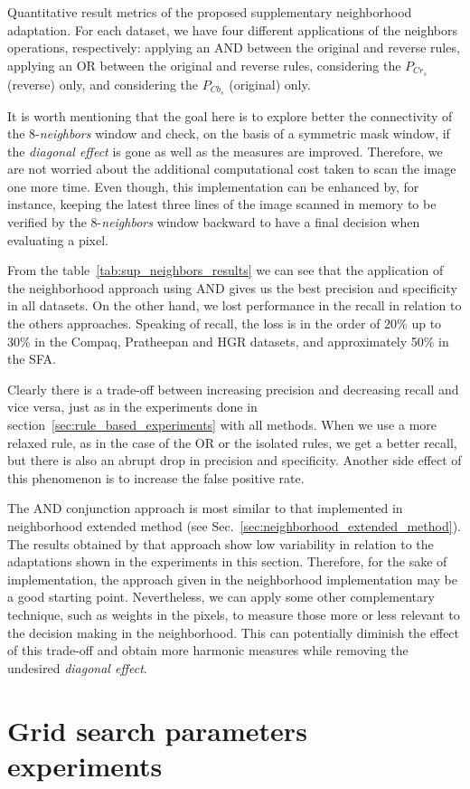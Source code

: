 \begin{table}[ht]
\caption[Quantitative result metrics of the proposed supplementary neighborhood adaptation]{Quantitative result metrics of the proposed supplementary neighborhood adaptation. For each dataset, we have four different applications of the neighbors operations, respectively: applying an AND between the original and reverse rules, applying an OR between the original and reverse rules, considering the $P_{Cr_{s}}$ (reverse) only, and considering the $P_{Cb_{s}}$ (original) only.}
\label{tab:sup_neighbors_results}

\end{table}

It is worth mentioning that the goal here is to explore better the connectivity of the 8-\textit{neighbors} window and check, on the basis of a symmetric mask window, if the \textit{diagonal effect} is gone as well as the measures are improved. Therefore, we are not worried about the additional computational cost taken to scan the image one more time. Even though, this implementation can be enhanced by, for instance, keeping the latest three lines of the image scanned in memory to be verified by the 8-\textit{neighbors} window backward to have a final decision when evaluating a pixel.

From the table~\ref{tab:sup_neighbors_results} we can see that the application of the neighborhood approach using AND gives us the best precision and specificity in all datasets. On the other hand, we lost performance in the recall in relation to the others approaches. Speaking of recall, the loss is in the order of 20\% up to 30\% in the Compaq, Pratheepan and HGR datasets, and approximately 50\% in the SFA.

Clearly there is a trade-off between increasing precision and decreasing recall and vice versa, just as in the experiments done in section~\ref{sec:rule_based_experiments} with all methods. When we use a more relaxed rule, as in the case of the OR or the isolated rules, we get a better recall, but there is also an abrupt drop in precision and specificity. Another side effect of this phenomenon is to increase the false positive rate.

The AND conjunction approach is most similar to that implemented in neighborhood extended method (see Sec.~\ref{sec:neighborhood_extended_method}). The results obtained by that approach show low variability in relation to the adaptations shown in the experiments in this section. Therefore, for the sake of implementation, the approach given in the neighborhood implementation may be a good starting point. Nevertheless, we can apply some other complementary technique, such as weights in the pixels, to measure those more or less relevant to the decision making in the neighborhood. This can potentially diminish the effect of this trade-off and obtain more harmonic measures while removing the undesired \textit{diagonal effect}.


\section{Grid search parameters experiments}
\label{sec:grid_search_experiments}

